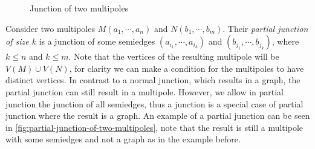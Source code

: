 \documentclass[12pt, twoside]{book}
\begin{document}
\begin{figure}
	\caption{Junction of two multipoles}
	\label{fig:junction-of-two-multipoles}
\end{figure}

Consider two multipoles $M(a_1,\cdots,a_n)$ and $N(b_1,\cdots,b_m)$. Their \textit{partial junction of size $k$} is a junction of some semiedges $(a_{i_1},\cdots, a_{i_k})$ and $(b_{j_1},\cdots, b_{j_k})$, where $k\leq n$ and $k\leq m$. Note that the vertices of the resulting multipole will be $V(M)\cup V(N)$, for clarity we can make a condition for the multipoles to have distinct vertices. In contrast to a normal junction, which results in a graph, the partial junction can still result in a multipole. However, we allow in partial junction the junction of all semiedges, thus a junction is a special case of partial junction where the result is a graph. An example of a partial junction can be seen in \cref{fig:partial-junction-of-two-multipoles}, note that the result is still a multipole with some semiedges and not a graph as in the example before.
\end{document}
